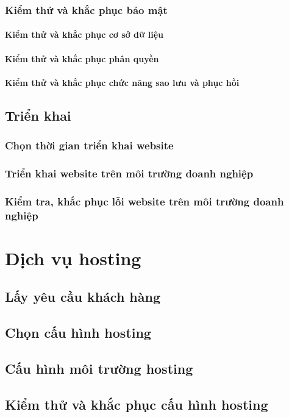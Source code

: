 \documentclass[a4paper]{book}
\begin{document}
\subsubsection{Kiểm thử và khắc phục bảo mật}
\paragraph{Kiểm thử và khắc phục cơ sở dữ liệu}
\paragraph{Kiểm thử và khắc phục phân quyền}
\paragraph{Kiểm thử và khắc phục chức năng sao lưu và phục hồi}
\subsection{Triển khai}
\subsubsection{Chọn thời gian triển khai website}
\subsubsection{Triển khai website trên môi trường doanh nghiệp}
\subsubsection{Kiểm tra, khắc phục lỗi website trên môi trường doanh nghiệp}
\section{Dịch vụ hosting}
\subsection{Lấy yêu cầu khách hàng}
\subsection{Chọn cấu hình hosting}
\subsection{Cấu hình môi trường hosting}
\subsection{Kiểm thử và khắc phục cấu hình hosting}
\end{document}
